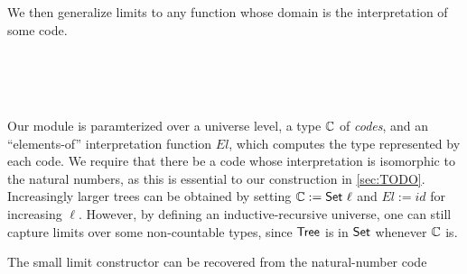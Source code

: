 We then generalize limits to any function whose domain is the interpretation of some code.
\begin{code}%
%
\>[4]\AgdaSpace{}%
\AgdaSpace{}%
\AgdaSymbol{:}\AgdaSpace{}%
\AgdaSpace{}%
\AgdaSpace{}%
\<%
\\
\>[4][@{}l@{\AgdaIndent{0}}]%
\>[6]\AgdaSpace{}%
\AgdaSymbol{:}\AgdaSpace{}%
\<%
\\
%
\>[6]\AgdaSpace{}%
\AgdaSymbol{:}\AgdaSpace{}%
\AgdaSpace{}%
\AgdaSpace{}%
\<%
\\
%
\>[6]\AgdaSpace{}%
\AgdaSymbol{:}\AgdaSpace{}%
%
\>[15]\AgdaSymbol{(}\AgdaSpace{}%
\AgdaSymbol{:}\AgdaSpace{}%
\AgdaSpace{}%
\AgdaSymbol{)}\AgdaSpace{}%
\AgdaSpace{}%
\AgdaSymbol{(}\AgdaSpace{}%
\AgdaSymbol{:}\AgdaSpace{}%
\AgdaSpace{}%
\AgdaSpace{}%
\AgdaSpace{}%
\AgdaSymbol{)}\AgdaSpace{}%
\AgdaSpace{}%
\<%
\end{code}

\begin{code}[hide]%
\>[0]\<%
\end{code}


Our module is paramterized over a universe level, a type ${\mathbb{C}}$ of \textit{codes}, and an ``elements-of'' interpretation
function $\mathit{El}$, which computes the type represented by each code.
We require that there be a code whose interpretation is isomorphic to the natural numbers,
as this is essential to our construction in \cref{sec:TODO}.
Increasingly larger trees can be obtained by setting $\bC := \AgdaPrimitive{Set} \ \ell$ and
$\mathit{El} := \mathit{id}$ for increasing $\ell$.
However, by defining an inductive-recursive universe,
one can still capture limits over some non-countable types, since
 $\AgdaDatatype{Tree}$ is in $\AgdaPrimitive{Set}$ whenever ${\mathbb{C}}$ is.

The small limit constructor can be recovered from the natural-number code
\begin{code}%
\>[0]\<%
\\
\>[0][@{}l@{\AgdaIndent{1}}]%
\>[4]\AgdaSpace{}%
\AgdaSymbol{:}\AgdaSpace{}%
\AgdaSymbol{(}\AgdaSpace{}%
\AgdaSpace{}%
\AgdaSymbol{)}\AgdaSpace{}%
\AgdaSpace{}%
\<%
\\
%
\>[4]\AgdaSpace{}%
\AgdaSpace{}%
\AgdaSymbol{=}\AgdaSpace{}%
\AgdaSpace{}%
%
\>[21]\AgdaSpace{}%
\AgdaSpace{}%
\AgdaSpace{}%
\AgdaSpace{}%
\AgdaSymbol{(}\AgdaSpace{}%
\AgdaSpace{}%
\AgdaSymbol{))}\<%
\end{code}

